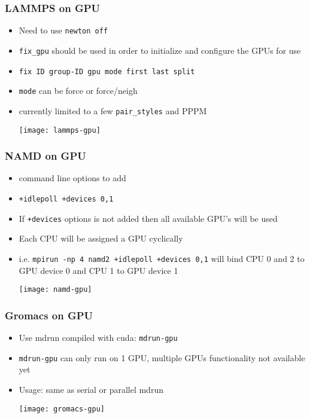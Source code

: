 \documentclass[slidestop,mathserif,compress,xcolor=svgnames]{beamer}
\begin{document}
\begin{frame}
\frametitle{\small LAMMPS on GPU}
\begin{itemize}
\item Need to use \texttt{newton off}
\item \texttt{fix\_gpu} should be used in order to initialize and configure the GPUs for use
\item[] \texttt{fix ID group-ID gpu mode first last split}
\item[] \texttt{mode} can be force or force/neigh
\item currently limited to a few \texttt{pair\_styles} and PPPM
\begin{center}
\texttt{[image: lammps-gpu]}
\end{center}
\end{itemize}
\end{frame}

\begin{frame}
\frametitle{\small NAMD on GPU}
\begin{itemize}
\item command line options to add
\item[] \texttt{+idlepoll +devices 0,1}
\item[] If \texttt{+devices} options is not added then all available GPU's will be used
\item[] Each CPU will be assigned a GPU cyclically
\item[] i.e. \texttt{mpirun -np 4 namd2 +idlepoll +devices 0,1} will bind CPU 0 and 2 to GPU device 0 and CPU 1 to GPU device 1
\begin{center}
\texttt{[image: namd-gpu]}
\end{center}
\end{itemize}
\end{frame}

\begin{frame}
\frametitle{\small Gromacs on GPU}
\begin{itemize}
\item Use mdrun compiled with cuda: \texttt{mdrun-gpu}
\item \texttt{mdrun-gpu} can only run on 1 GPU, multiple GPUs functionality not available yet
\item Usage: same as serial or parallel mdrun
\begin{center}
\texttt{[image: gromacs-gpu]}
\end{center}
\end{itemize}
\end{frame}
\end{document}

